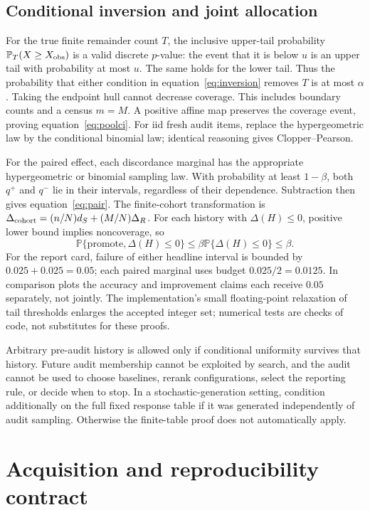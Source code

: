 \documentclass{article}
\newcommand{\Prob}{\mathbb P}
\begin{document}
\subsection{Conditional inversion and joint allocation}
For the true finite remainder count $T$, the inclusive upper-tail probability $\Prob_T(X\geq X_{\rm obs})$ is a valid discrete $p$-value: the event that it is below $u$ is an upper tail with probability at most $u$. The same holds for the lower tail. Thus the probability that either condition in equation~\eqref{eq:inversion} removes $T$ is at most $\alpha$. Taking the endpoint hull cannot decrease coverage. This includes boundary counts and a census $m=M$. A positive affine map preserves the coverage event, proving equation~\eqref{eq:poolci}. For iid fresh audit items, replace the hypergeometric law by the conditional binomial law; identical reasoning gives Clopper--Pearson.

For the paired effect, each discordance marginal has the appropriate hypergeometric or binomial sampling law. With probability at least $1-\beta$, both $q^+$ and $q^-$ lie in their intervals, regardless of their dependence. Subtraction then gives equation~\eqref{eq:pair}. The finite-cohort transformation is $\Delta_{\rm cohort}=(n/N)d_S+(M/N)\Delta_R$. For each history with $\Delta(H)\leq0$, positive lower bound implies noncoverage, so
\[
\Prob\{\mathrm{promote},\Delta(H)\leq0\}\leq\beta\Prob\{\Delta(H)\leq0\}\leq\beta.
\]
For the report card, failure of either headline interval is bounded by $0.025+0.025=0.05$; each paired marginal uses budget $0.025/2=0.0125$. In comparison plots the accuracy and improvement claims each receive $0.05$ separately, not jointly. The implementation's small floating-point relaxation of tail thresholds enlarges the accepted integer set; numerical tests are checks of code, not substitutes for these proofs.

Arbitrary pre-audit history is allowed only if conditional uniformity survives that history. Future audit membership cannot be exploited by search, and the audit cannot be used to choose baselines, rerank configurations, select the reporting rule, or decide when to stop. In a stochastic-generation setting, condition additionally on the full fixed response table if it was generated independently of audit sampling. Otherwise the finite-table proof does not automatically apply.

\section{Acquisition and reproducibility contract}\label{app:repro}
\end{document}
